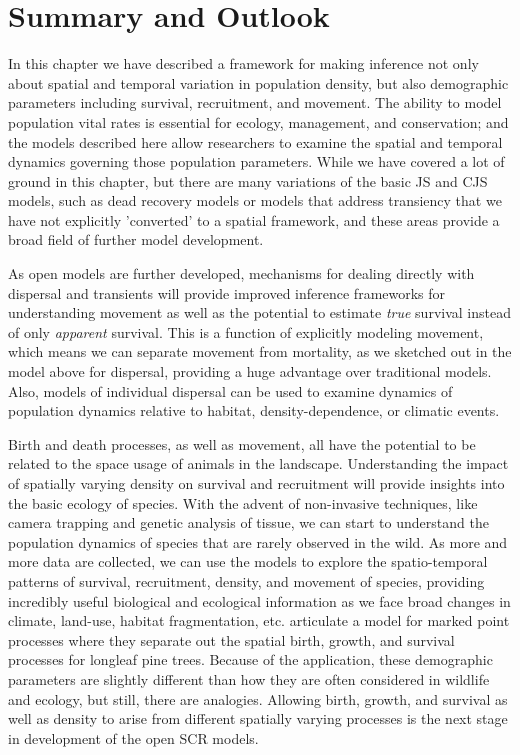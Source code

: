 \section{Summary and Outlook}

In this chapter we have described a framework for making inference not
only about spatial and temporal variation in population density, but
also demographic parameters including survival, recruitment, and
movement. The ability to model population vital rates is essential for
ecology, management, and conservation; and the models described here
allow researchers to examine the spatial and temporal dynamics
governing those population parameters.  While we have covered a lot of ground
in this chapter, but there are many variations of the basic JS and CJS models, such as dead recovery models
or models that address transiency that we have not explicitly 'converted' to a spatial framework, 
and these areas provide a broad field of further model development.

As open models are further developed, mechanisms for dealing directly
with dispersal and transients will provide improved inference
frameworks for understanding movement as well as the potential to
estimate {\it true} survival instead of only {\it apparent} survival.
This is a function of explicitly modeling movement, which means we can
separate movement from mortality, as we sketched out in the model
above for dispersal, providing a huge advantage over traditional
models.  Also, models of individual dispersal can be used to examine
dynamics of population dynamics relative to habitat,
density-dependence, or climatic events.

Birth and death processes, as well as movement, all have the potential
to be related to the space usage of animals in the landscape.
Understanding the impact of spatially varying density on survival and
recruitment will provide insights into the basic ecology of species.
With the advent of non-invasive techniques, like camera trapping and
genetic analysis of tissue, we can start to understand the population
dynamics of species that are rarely observed in the wild.  As more and
more data are collected, we can use the models to explore the
spatio-temporal patterns of survival, recruitment, density, and
movement of species, providing incredibly useful biological and
ecological information as we face broad changes in climate, land-use,
habitat fragmentation, etc.  \citet{rathbun_cressie:1994} articulate a
model for marked point processes where they separate out the spatial
birth, growth, and survival processes for longleaf pine trees.
Because of the application, these demographic parameters are slightly
different than how they are often considered in wildlife and ecology,
but still, there are analogies.  Allowing birth, growth, and survival as well
as density to arise from different spatially varying processes is the
next stage in development of the open SCR models.


